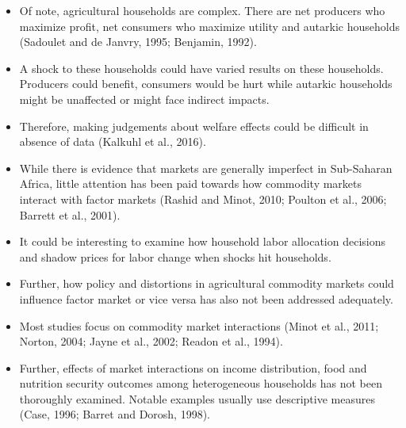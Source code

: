 \documentclass{beamer}
\begin{document}
  \begin{frame}
  	\begin{itemize}
  		\item <1-| alert@1> Of note, agricultural households are complex. There are net producers who maximize profit, net consumers who maximize utility and autarkic households (Sadoulet and de Janvry, 1995; Benjamin, 1992). 
  		\item A shock to these households could have varied results on these households. Producers could benefit, consumers would be hurt while autarkic households might be unaffected or might face indirect impacts.
	    \item  <2-| alert@2> Therefore, making judgements about welfare effects could be difficult in absence of data (Kalkuhl et al., 2016).  
  	\end{itemize}
  \end{frame}
  \begin{frame}
  	\begin{itemize}
  		\item <1-| alert@1> While there is evidence that markets are generally imperfect in Sub-Saharan Africa, little attention has been paid towards how commodity markets interact with factor markets (Rashid and Minot, 2010; Poulton et al., 2006; Barrett et al., 2001). 
  		\item It could be interesting to examine how household labor allocation decisions and shadow prices for labor change when shocks hit households.  
  		\item <2-| alert@2> Further, how policy and distortions in agricultural commodity markets could influence factor market or vice versa has also not been addressed adequately. 
  	\end{itemize}
  \end{frame}
  \begin{frame}
  	\begin{itemize}
  		\item <1-| alert@1> Most studies focus on commodity market interactions (Minot et al., 2011; Norton, 2004; Jayne et al., 2002; Readon et al., 1994). 
  		\item <2-| alert@2>Further, effects of market interactions on income distribution, food and nutrition security outcomes among heterogeneous households has not been thoroughly examined. Notable examples usually use descriptive measures (Case, 1996; Barret and Dorosh, 1998).
  	\end{itemize}
  \end{frame}
  
\end{document}
